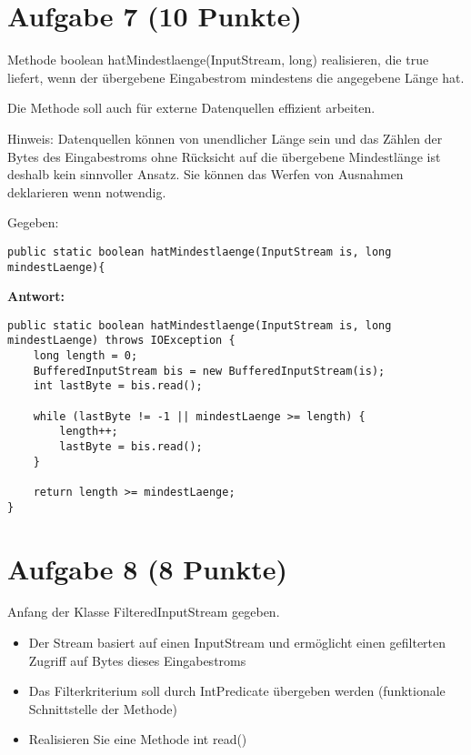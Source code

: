 \section{Aufgabe 7 (10 Punkte)}

Methode boolean hatMindestlaenge(InputStream, long) realisieren, die true
liefert, wenn der übergebene Eingabestrom mindestens die angegebene Länge hat.

Die Methode soll auch für externe Datenquellen effizient arbeiten.

Hinweis: Datenquellen können von unendlicher Länge sein und das Zählen der
Bytes des Eingabestroms ohne Rücksicht auf die übergebene Mindestlänge ist
deshalb kein sinnvoller Ansatz. Sie können das Werfen von Ausnahmen deklarieren
wenn notwendig.

Gegeben:

\begin{lstlisting}
public static boolean hatMindestlaenge(InputStream is, long mindestLaenge){
\end{lstlisting}

\textbf{Antwort:}

\begin{lstlisting}
public static boolean hatMindestlaenge(InputStream is, long mindestLaenge) throws IOException {
    long length = 0;
    BufferedInputStream bis = new BufferedInputStream(is);
    int lastByte = bis.read();

    while (lastByte != -1 || mindestLaenge >= length) {
        length++;
        lastByte = bis.read();
    }

    return length >= mindestLaenge;
}
\end{lstlisting}

\section{Aufgabe 8 (8 Punkte)}

Anfang der Klasse FilteredInputStream gegeben.

\begin{itemize}
    \item Der Stream basiert auf einen InputStream und ermöglicht einen gefilterten
          Zugriff auf Bytes dieses Eingabestroms
    \item Das Filterkriterium soll durch IntPredicate übergeben werden (funktionale
          Schnittstelle der Methode)
    \item Realisieren Sie eine Methode int read()
\end{itemize}

